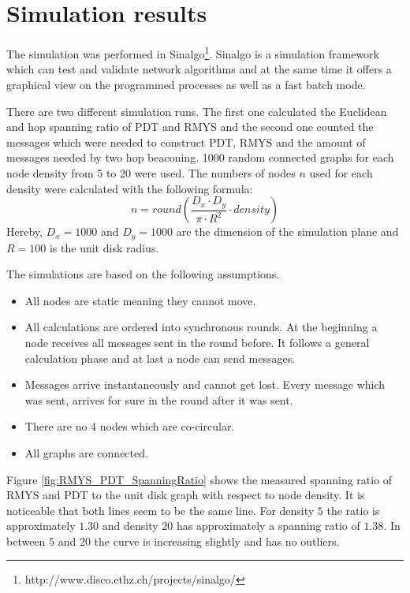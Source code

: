 \section{Simulation results}
The simulation was performed in Sinalgo\footnote{http://www.disco.ethz.ch/projects/sinalgo/}.
Sinalgo is a simulation framework which can test and validate network algorithms and at the same time it offers a graphical view on the programmed processes as well as a fast batch mode.

There are two different simulation runs.
The first one calculated the Euclidean and hop spanning ratio of PDT and RMYS and the second one counted the messages which were needed to construct PDT, RMYS and the amount of messages needed by two hop beaconing.
1000 random connected graphs for each node density from 5 to 20 were used.
The numbers of nodes $n $ used for each density were calculated with the following formula:
\begin{equation*}
n =round( \frac{D_x \cdot D_y}{\pi \cdot R^2} \cdot density)
\end{equation*}
Hereby, $D_x=1000 $ and $D_y=1000 $ are the dimension of the simulation plane and $R = 100 $ is the unit disk radius.

\bigskip

The simulations are based on the following assumptions.
\begin{itemize}
\item All nodes are static meaning they cannot move.
\item All calculations are ordered into synchronous rounds. 
At the beginning a node receives all messages sent in the round before.
It follows a general calculation phase and at last a node can send messages.
\item Messages arrive instantaneously and cannot get lost.
Every message which was sent, arrives for sure in the round after it was sent.
\item There are no 4 nodes which are co-circular.
\item All graphs are connected.
\end{itemize}


Figure \ref{fig:RMYS_PDT_SpanningRatio} shows the measured spanning ratio of RMYS and PDT to the unit disk graph with respect to node density.
It is noticeable that both lines seem to be the same line.
For density $5 $ the ratio is approximately $1.30 $ and density 20 has approximately a spanning ratio of $1.38 $.
In between 5 and 20 the curve is increasing slightly and has no outliers.

